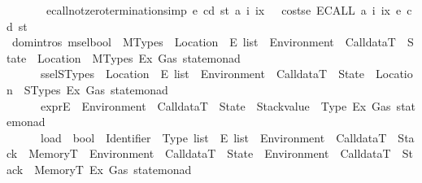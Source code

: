 \begin{isabellebody}
\ \ \ \ \ \ \ ecall{\isacharunderscore}{\kern0pt}not{\isacharunderscore}{\kern0pt}zero{\isacharbrackleft}{\kern0pt}termination{\isacharunderscore}{\kern0pt}simp{\isacharbrackright}{\kern0pt}{\isacharcolon}{\kern0pt}\ {\isachardoublequoteopen}{\isasymAnd}e\ cd\ st\ a\ i\ ix{\isachardot}{\kern0pt}\ {}\ {\isacharless}{\kern0pt}\ {\isacharparenleft}{\kern0pt}costs\isactrlsub e\ {\isacharparenleft}{\kern0pt}ECALL\ a\ i\ ix{\isacharparenright}{\kern0pt}\ e\ cd\ st{\isacharparenright}{\kern0pt}{\isachardoublequoteclose}\isanewline
{}\isanewline
{}\isamarkupfalse%
\ {\isacharparenleft}{\kern0pt}domintros{\isacharparenright}{\kern0pt}\ msel{\isacharcolon}{\kern0pt}{\isacharcolon}{\kern0pt}{\isachardoublequoteopen}bool\ {\isasymRightarrow}\ MTypes\ {\isasymRightarrow}\ Location\ {\isasymRightarrow}\ E\ list\ {\isasymRightarrow}\ Environment\ {\isasymRightarrow}\ CalldataT\ {\isasymRightarrow}\ State\ {\isasymRightarrow}\ {\isacharparenleft}{\kern0pt}Location\ {\isacharasterisk}{\kern0pt}\ MTypes{\isacharcomma}{\kern0pt}\ Ex{\isacharcomma}{\kern0pt}\ Gas{\isacharparenright}{\kern0pt}\ state{\isacharunderscore}{\kern0pt}monad{\isachardoublequoteclose}\isanewline
\ \ \ \ \ \ ssel{\isacharcolon}{\kern0pt}{\isacharcolon}{\kern0pt}{\isachardoublequoteopen}STypes\ {\isasymRightarrow}\ Location\ {\isasymRightarrow}\ E\ list\ {\isasymRightarrow}\ Environment\ {\isasymRightarrow}\ CalldataT\ {\isasymRightarrow}\ State\ {\isasymRightarrow}\ {\isacharparenleft}{\kern0pt}Location\ {\isacharasterisk}{\kern0pt}\ STypes{\isacharcomma}{\kern0pt}\ Ex{\isacharcomma}{\kern0pt}\ Gas{\isacharparenright}{\kern0pt}\ state{\isacharunderscore}{\kern0pt}monad{\isachardoublequoteclose}\isanewline
\ \ \ \ \ \ expr{\isacharcolon}{\kern0pt}{\isacharcolon}{\kern0pt}{\isachardoublequoteopen}E\ {\isasymRightarrow}\ Environment\ {\isasymRightarrow}\ CalldataT\ {\isasymRightarrow}\ State\ {\isasymRightarrow}\ {\isacharparenleft}{\kern0pt}Stackvalue\ {\isacharasterisk}{\kern0pt}\ Type{\isacharcomma}{\kern0pt}\ Ex{\isacharcomma}{\kern0pt}\ Gas{\isacharparenright}{\kern0pt}\ state{\isacharunderscore}{\kern0pt}monad{\isachardoublequoteclose}\isanewline
\ \ \ \ \ \ load\ {\isacharcolon}{\kern0pt}{\isacharcolon}{\kern0pt}\ {\isachardoublequoteopen}bool\ {\isasymRightarrow}\ {\isacharparenleft}{\kern0pt}Identifier\ {\isasymtimes}\ Type{\isacharparenright}{\kern0pt}\ list\ {\isasymRightarrow}\ E\ list\ {\isasymRightarrow}\ Environment\ {\isasymRightarrow}\ CalldataT\ {\isasymRightarrow}\ Stack\ {\isasymRightarrow}\ MemoryT\ {\isasymRightarrow}\ Environment\ {\isasymRightarrow}\ CalldataT\ {\isasymRightarrow}\ State\ {\isasymRightarrow}\ {\isacharparenleft}{\kern0pt}Environment\ {\isasymtimes}\ CalldataT\ {\isasymtimes}\ Stack\ {\isasymtimes}\ MemoryT{\isacharcomma}{\kern0pt}\ Ex{\isacharcomma}{\kern0pt}\ Gas{\isacharparenright}{\kern0pt}\ state{\isacharunderscore}{\kern0pt}monad{\isachardoublequoteclose}\isanewline

\end{isabellebody}

